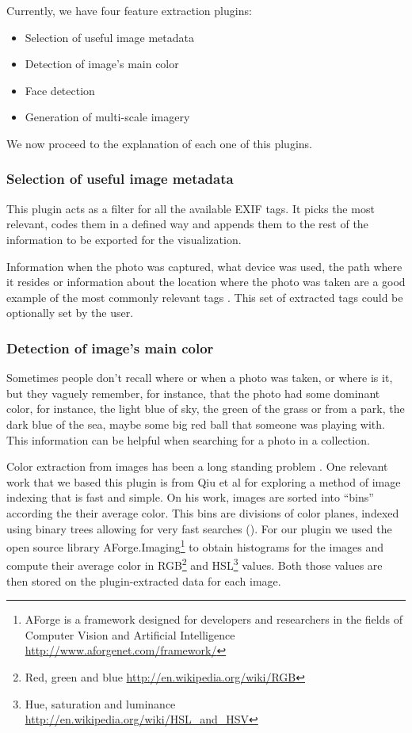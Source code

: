 Currently, we have four feature extraction plugins:
\begin{itemize}
	\item Selection of useful image metadata
	\item Detection of image’s main color
	\item Face detection
	\item Generation of multi-scale imagery
\end{itemize}

We now proceed to the explanation of each one of this plugins. 

\subsubsection{Selection of useful image metadata}

This plugin acts as a filter for all the available \ac{EXIF} tags. It picks the most relevant, codes them in a defined way and appends them to the rest of the information to be exported for the visualization.

Information when the photo was captured, what device was used, the path where it resides or information about the location where the photo was taken are a good example of the most commonly relevant tags . This set of extracted tags could be optionally set by the user.



\subsubsection{Detection of image’s main color}

Sometimes people don’t recall where or when a photo was taken, or where is it, but they vaguely remember, for instance, that the photo had some dominant color, for instance, the light blue of sky, the green of the grass or from a park, the dark blue of the sea, maybe some big red ball that someone was playing with. This information can be helpful when searching for a photo in a collection.

Color extraction from images has been a long standing problem . One relevant work that we based this plugin is from Qiu et al\cite{Qiu:2007p1207} for exploring a method of image indexing that is fast and simple. On his work, images are sorted into ``bins'' according the their average color. This bins are divisions of color planes, indexed using binary trees allowing for very fast searches (). For our plugin we used the open source library AForge.Imaging\footnote{AForge is a framework designed for developers and researchers in the fields of Computer Vision and Artificial Intelligence \url{http://www.aforgenet.com/framework/}} to obtain histograms for the images and compute their average color in RGB\footnote{Red, green and blue \url{http://en.wikipedia.org/wiki/RGB}} and HSL\footnote{Hue, saturation and luminance \url{http://en.wikipedia.org/wiki/HSL_and_HSV}} values. Both those values are then stored on the plugin-extracted data for each image.

